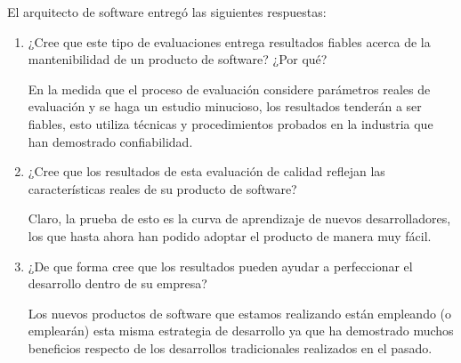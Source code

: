 El arquitecto de software entregó las siguientes respuestas:
\begin{enumerate}
    \item ¿Cree que este tipo de evaluaciones entrega resultados fiables acerca de la mantenibilidad de un producto de software? ¿Por qué?

En la medida que el proceso de evaluación considere parámetros reales de evaluación y 
se haga un estudio minucioso, los resultados tenderán a ser fiables, 
esto utiliza técnicas y procedimientos probados en la industria que han demostrado confiabilidad.

\item ¿Cree que los resultados de esta evaluación de calidad reflejan las características reales de su producto de software?

Claro, la prueba de esto es la curva de aprendizaje de nuevos desarrolladores, 
los que hasta ahora han podido adoptar el producto de manera muy fácil.

\item ¿De que forma cree que los resultados pueden ayudar a perfeccionar el desarrollo dentro de su empresa?

Los nuevos productos de software que estamos realizando están empleando (o emplearán)
esta misma estrategia de desarrollo ya que ha demostrado muchos beneficios 
respecto de los desarrollos tradicionales realizados en el pasado.
\end{enumerate}
